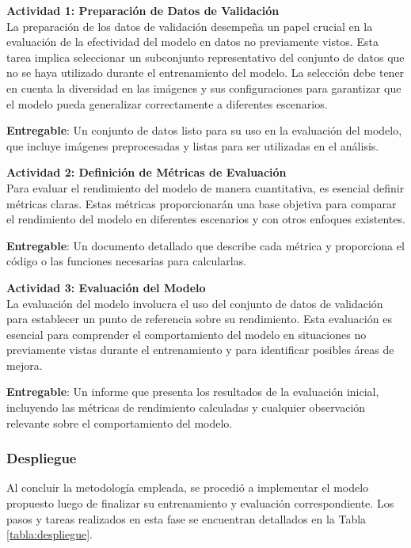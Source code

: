  \textbf{Actividad 1: Preparación de Datos de Validación}
 \\
 La preparación de los datos de validación desempeña un papel crucial en la evaluación de la efectividad del modelo en datos no previamente vistos. Esta tarea implica seleccionar un subconjunto representativo del conjunto de datos que no se haya utilizado durante el entrenamiento del modelo. La selección debe tener en cuenta la diversidad en las imágenes y sus configuraciones para garantizar que el modelo pueda generalizar correctamente a diferentes escenarios.
 
 \textbf{Entregable}: Un conjunto de datos listo para su uso en la evaluación del modelo, que incluye imágenes preprocesadas y listas para ser utilizadas en el análisis.
 
 \textbf{Actividad 2: Definición de Métricas de Evaluación}
 \\
 Para evaluar el rendimiento del modelo de manera cuantitativa, es esencial definir métricas claras. Estas métricas proporcionarán una base objetiva para comparar el rendimiento del modelo en diferentes escenarios y con otros enfoques existentes.
 
 \textbf{Entregable}: Un documento detallado que describe cada métrica y proporciona el código o las funciones necesarias para calcularlas.
 
 \textbf{Actividad 3: Evaluación del Modelo}
 \\
 La evaluación del modelo involucra el uso del conjunto de datos de validación para establecer un punto de referencia sobre su rendimiento. Esta evaluación es esencial para comprender el comportamiento del modelo en situaciones no previamente vistas durante el entrenamiento y para identificar posibles áreas de mejora.
 
 \textbf{Entregable}: Un informe que presenta los resultados de la evaluación inicial, incluyendo las métricas de rendimiento calculadas y cualquier observación relevante sobre el comportamiento del modelo.
 
\subsubsection{Despliegue}
Al concluir la metodología empleada, se procedió a implementar el modelo propuesto luego de finalizar su entrenamiento y evaluación correspondiente. Los pasos y tareas realizados en esta fase se encuentran detallados en la Tabla \ref{tabla:despliegue}.

